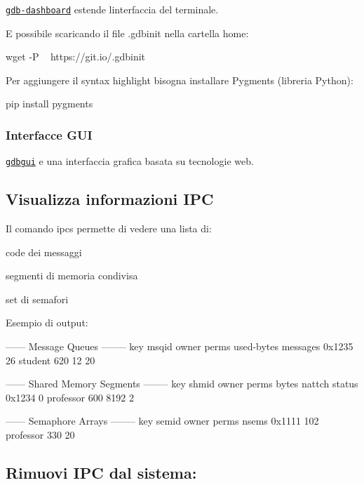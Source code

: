 \href{https://github.com/cyrus-and/gdb-dashboard}{\tt gdb-\/dashboard} estende l\textquotesingle{}interfaccia del terminale.



E\textquotesingle{} possibile scaricando il file {\ttfamily .gdbinit} nella cartella home\+: 
\begin{DoxyCode}
wget -P ~ https://git.io/.gdbinit
\end{DoxyCode}


Per aggiungere il syntax highlight bisogna installare Pygments (libreria Python)\+: 
\begin{DoxyCode}
pip install pygments
\end{DoxyCode}


\subsubsection*{Interfacce G\+UI}

\href{https://github.com/cs01/gdbgui}{\tt gdbgui} e\textquotesingle{} una interfaccia grafica basata su tecnologie web.



\subsection*{Visualizza informazioni I\+PC}

Il comando {\ttfamily ipcs} permette di vedere una lista di\+:
\begin{DoxyItemize}
\item code dei messaggi
\item segmenti di memoria condivisa
\item set di semafori
\end{DoxyItemize}

Esempio di output\+: 
\begin{DoxyCode}
------ Message Queues --------
key     msqid  owner    perms  used-bytes  messages
0x1235  26     student  620    12          20

------ Shared Memory Segments --------
key     shmid  owner      perms  bytes  nattch  status
0x1234  0      professor  600    8192   2

------ Semaphore Arrays --------
key     semid  owner      perms  nsems
0x1111  102    professor  330    20
\end{DoxyCode}


\subsection*{Rimuovi I\+PC dal sistema\+:}

